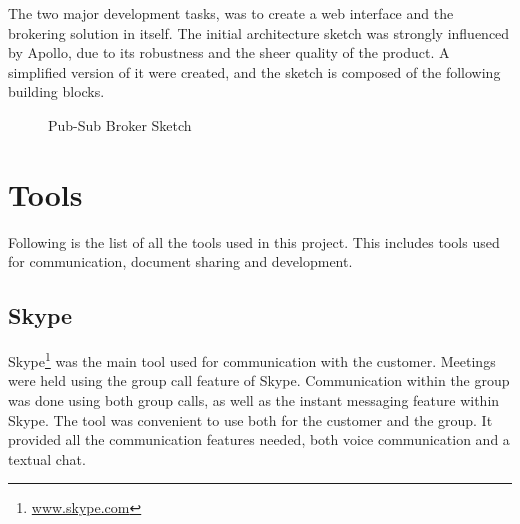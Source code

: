 The two major development tasks, was to create a web interface and the brokering solution in itself. The initial architecture sketch was strongly influenced by Apollo, due to its robustness and the sheer quality of the product. A simplified version of it were created, and the sketch is composed of the following building blocks.

\begin{center}
  \begin{figure}[ht!]
    \caption{Pub-Sub Broker Sketch}
    \label{fig:arch_proposal}
  \end{figure}
\end{center}

\section{Tools}

Following is the list of all the tools used in this project. This includes tools used for communication, document sharing and development.

\subsection{Skype}

Skype\footnote{\url{www.skype.com}} was the main tool used for communication with the customer. Meetings were held using the group call feature of Skype. Communication within the group was done using both group calls, as well as the instant messaging feature within Skype. The tool was convenient to use both for the customer and the group. It provided all the communication features needed, both voice communication and a textual chat.

